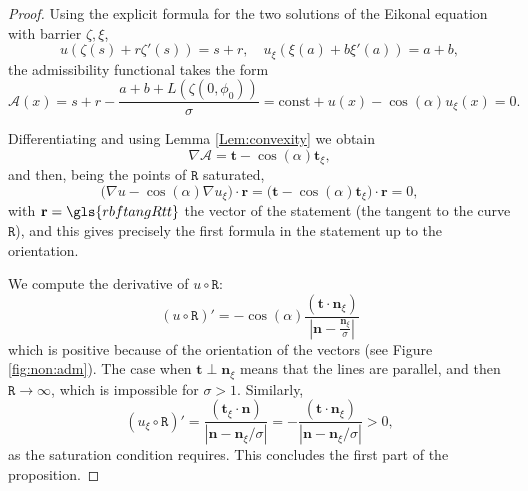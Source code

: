 \documentclass[reqno]{amsart}
\theoremstyle{definition} \newtheorem{definition}{Definition}[section]
\theoremstyle{definition} \newtheorem{remark}[definition]{Remark}
\theoremstyle{plain} \newtheorem{lemma}[definition]{Lemma}
\theoremstyle{plain} \newtheorem{proposition}[definition]{Proposition}
\theoremstyle{plain} \newtheorem{theorem}[definition]{Theorem}
\theoremstyle{plain} \newtheorem{corollary}[definition]{Corollary}
\theoremstyle{definition} \newtheorem{example}[definition]{Example}
\theoremstyle{plain} \newtheorem{claim}[clai]{Claim}
\theoremstyle{definition} \newtheorem{assumption}[definition]{Assumption}
\theoremstyle{definition} \newtheorem{observation}[definition]{Observation}
\newcommand{\1}{\mathbbm 1}
\numberwithin{equation}{section} %
\theoremstyle{plain} \newtheorem*{theorem*}{Theorem}
\theoremstyle{plain} \newtheorem{mthm}[maintheorem]{Main Theorem}
\theoremstyle{plain} \newtheorem*{mthm*}{Main Theorem}
\theoremstyle{plain} \newtheorem*{conjecture*}{Conjecture}
\theoremstyle{plain} \newtheorem{conjecture}[definition]{Conjecture}
\theoremstyle{plain} \newtheorem*{problem*}{Problem}
\begin{document}
\begin{proof}
Using the explicit formula for the two solutions of the Eikonal equation with barrier $\zeta,\xi$,
\begin{equation*}
u(\zeta(s) + r \zeta'(s)) = s + r, \quad u_\xi(\xi(a) + b \xi'(a)) = a + b,
\end{equation*}
the admissibility functional takes the form
\begin{equation*}
\mathcal A(x) = s + r - \frac{a+b + L(\zeta(0,{\phi_0}))}{\sigma} = \text{const} + u(x) - \cos(\alpha) u_\xi(x) = 0.
\end{equation*}

Differentiating and using Lemma \ref{Lem:convexity} we obtain
\begin{equation*}
\nabla \mathcal A = \mathbf t - \cos( \alpha) \mathbf t_\xi,
\end{equation*}
and then, being the points of $\mathtt R$ saturated,
\begin{equation*}
\big( \nabla u - \cos( \alpha) \nabla u_\xi \big) \cdot \mathbf r = \big( \mathbf t - \cos( \alpha) \mathbf t_\xi \big) \cdot \mathbf r = 0,
\end{equation*}
with $\textbf r = \gls{rbftangRtt}$ the vector of the statement (the tangent to the curve $\mathtt R$), and this gives precisely the first formula in the statement up to the orientation. 

We compute the derivative of $u \circ \mathtt R$:
\begin{equation*}
(u \circ \mathtt R)' = - \cos(\alpha) \frac{(\mathbf t \cdot \mathbf n_\xi)}{|\mathbf n - \frac{\mathbf n_\xi}{\sigma}|}
\end{equation*}
which is positive because of the orientation of the vectors (see Figure \ref{fig:non:adm}). The case when $\mathbf t \perp \mathbf n_\xi$ means that the lines are parallel, and then $\mathtt R \to \infty$, which is impossible for $\sigma > 1$. Similarly,
\begin{equation*}
(u_\xi \circ \mathtt R)' = \frac{(\mathbf t_\xi \cdot \mathbf n)}{|\mathbf n - \mathbf n_\xi/\sigma|} = - \frac{(\mathbf t \cdot \mathbf n_\xi)}{|\mathbf n - \mathbf n_\xi/\sigma|} > 0,
\end{equation*}
as the saturation condition requires. This concludes the first part of the proposition.


\end{proof}
\end{document}
